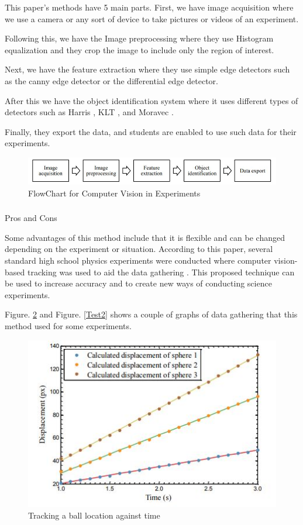 \documentclass[conference]{IEEEtran}
\begin{document}
This paper’s methods have 5 main parts. First, we have image acquisition where we use a camera or any sort of device to take pictures or videos of an experiment. 

Following this, we have the Image preprocessing where they use Histogram equalization and they crop the image to include only the region of interest.

Next, we have the feature extraction where they use simple edge detectors such as the canny edge detector or the differential edge detector.

After this we have the object identification system where it uses different types of detectors such as Harris \cite{b11}, KLT \cite{b12}, and Moravec \cite{b13}.

Finally, they export the data, and students are enabled to use such data for their experiments. 

\begin{figure}[htbp]
\includegraphics[width=\columnwidth]{FlowChar2.JPG}
\caption{FlowChart for Computer Vision in Experiments}
\label{FlowChart2}
\end{figure}

\subsubsection{}Pros and Cons 

Some advantages of this method include that it is flexible and can be changed depending on the experiment or situation. According to this paper, several standard high school physics experiments were conducted where computer vision-based tracking was used to aid the data gathering \cite{b10}. This proposed technique can be used to increase accuracy and to create new ways of conducting science experiments.

Figure. \ref{Track1} and Figure. \ref{Test2} shows a couple of graphs of data gathering that this method used for some experiments.

\begin{figure}[htbp]
\includegraphics[width=\columnwidth]{Fig2.JPG}
\caption{Tracking a ball location against time}
\label{Track1}
\end{figure}
\end{document}
